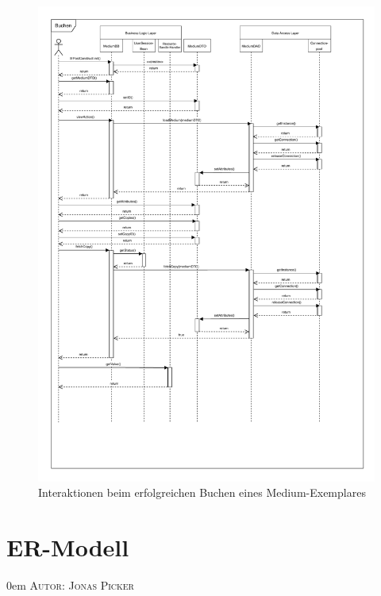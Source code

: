 \documentclass{article}
\makeatletter
\newcommand{\sectionauthor}[1]{
	{\parindent 0em \large \scshape Autor: #1 \par \nobreak \vspace*{1em}}
	\@afterheading
}
\makeatother
\begin{document}
\begin{figure}[h]
    \centering
    \includegraphics[width = 50em]{Sequenzdiagramm-success}
    \caption{Interaktionen beim erfolgreichen Buchen eines Medium-Exemplares}
    \label{Sequenzdiagramm}
\end{figure}

\restoregeometry
\newpage


\section{ER-Modell}
\sectionauthor{Jonas Picker}

\end{document}
